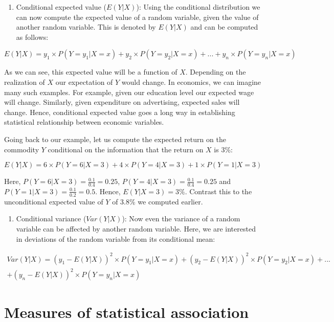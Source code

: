 \documentclass[
]{book}
\providecommand{\tightlist}{%
  \setlength{\itemsep}{0pt}\setlength{\parskip}{0pt}}
\theoremstyle{definition}
\theoremstyle{definition}
\theoremstyle{definition}
\theoremstyle{definition}
\theoremstyle{remark}
\begin{document}
\begin{enumerate}
\def\labelenumi{\arabic{enumi}.}
\tightlist
\item
  Conditional expected value (\(E(Y|X)\)): Using the conditional distribution we can now compute the expected value of a random variable, given the value of another random variable. This is denoted by \(E(Y|X)\) and can be computed as follows:
\end{enumerate}

\[E(Y|X)=y_1 \times P(Y=y_1|X=x) + y_2 \times P(Y=y_2|X=x)+...+ y_n \times P(Y=y_n|X=x)\]

As we can see, this expected value will be a function of \(X\). Depending on the realization of \(X\) our expectation of \(Y\) would change. In economics, we can imagine many such examples. For example, given our education level our expected wage will change. Similarly, given expenditure on advertising, expected sales will change. Hence, conditional expected value goes a long way in establishing statistical relationship between economic variables.

Going back to our example, let us compute the expected return on the commodity \(Y\) conditional on the information that the return on \(X\) is 3\%:

\[E(Y|X) = 6 \times P(Y=6|X=3) + 4 \times P(Y=4|X=3) + 1 \times P(Y=1|X=3)\]

Here, \(P(Y=6|X=3)= \displaystyle\frac{0.1}{0.4}=0.25\), \(P(Y=4|X=3)= \displaystyle\frac{0.1}{0.4}=0.25\) and \(P(Y=1|X=3)= \displaystyle\frac{0.1}{0.2}=0.5\). Hence, \(E(Y|X=3)=3\%\). Contrast this to the unconditional expected value of \(Y\) of 3.8\% we computed earlier.

\begin{enumerate}
\def\labelenumi{\arabic{enumi}.}
\setcounter{enumi}{1}
\tightlist
\item
  Conditional variance (\(Var(Y|X)\)): Now even the variance of a random variable can be affected by another random variable. Here, we are interested in deviations of the random variable from its conditional mean:
\end{enumerate}

\begin{align}
Var(Y|X) = (y_1 -E(Y|X))^2 \times P(Y=y_1|X=x) + (y_2 -E(Y|X))^2\times P(Y=y_2|X=x)+...\\ \nonumber
+ (y_n -E(Y|X))^2 \times P(Y=y_n|X=x)
\end{align}

\hypertarget{measures-of-statistical-association}{%
\section{Measures of statistical association}\label{measures-of-statistical-association}}
\end{document}
